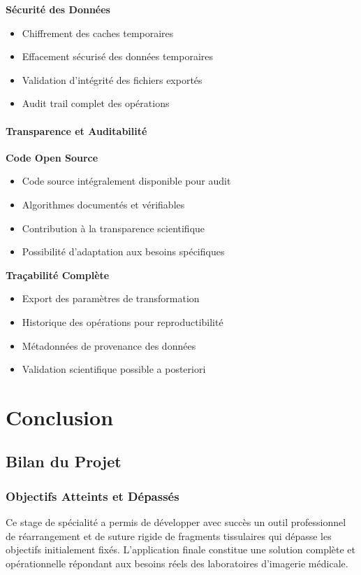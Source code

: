 \documentclass[12pt,a4paper]{report}
\begin{document}
\textbf{Sécurité des Données}
\begin{itemize}
\item Chiffrement des caches temporaires
\item Effacement sécurisé des données temporaires
\item Validation d'intégrité des fichiers exportés
\item Audit trail complet des opérations
\end{itemize}

\subsubsection{Transparence et Auditabilité}

\textbf{Code Open Source}
\begin{itemize}
\item Code source intégralement disponible pour audit
\item Algorithmes documentés et vérifiables
\item Contribution à la transparence scientifique
\item Possibilité d'adaptation aux besoins spécifiques
\end{itemize}

\textbf{Traçabilité Complète}
\begin{itemize}
\item Export des paramètres de transformation
\item Historique des opérations pour reproductibilité
\item Métadonnées de provenance des données
\item Validation scientifique possible a posteriori
\end{itemize}

\chapter{Conclusion}

\section{Bilan du Projet}

\subsection{Objectifs Atteints et Dépassés}

Ce stage de spécialité a permis de développer avec succès un outil professionnel de réarrangement et de suture rigide de fragments tissulaires qui dépasse les objectifs initialement fixés. L'application finale constitue une solution complète et opérationnelle répondant aux besoins réels des laboratoires d'imagerie médicale.
\end{document}
